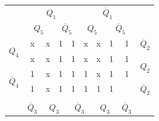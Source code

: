 \documentclass[a4paper,14pt]{article}
\begin{document}
\begin{table}[H]
\begin{minipage}{.5\linewidth}
\begin{tabular}{cccccccccc}
\end{tabular}
	\end{minipage}%
	\begin{minipage}{.5\linewidth}
		\centering
\begin{tabular}{cccccccccc}
	& \multicolumn{4}{c}{$Q_1$}                                                                         & \multicolumn{4}{c}{$\overline{Q}_1$}                                                              &                        \\
	& \multicolumn{2}{c}{$Q_5$}                       & \multicolumn{2}{c}{$\overline{Q}_5$}            & \multicolumn{2}{c}{$Q_5$}                       & \multicolumn{2}{c}{$\overline{Q}_5$}            &                        \\ \cline{2-9}
	\multicolumn{1}{c|}{\multirow{2}{*}{$Q_4$}}            & \multicolumn{1}{c|}{x} & \multicolumn{1}{c|}{x} & \multicolumn{1}{c|}{1} & \multicolumn{1}{c|}{1} & \multicolumn{1}{c|}{x} & \multicolumn{1}{c|}{x} & \multicolumn{1}{c|}{1} & \multicolumn{1}{c|}{1} & $\overline{Q}_2$       \\ \cline{2-9}
	\multicolumn{1}{c|}{}                                  & \multicolumn{1}{c|}{x} & \multicolumn{1}{c|}{x} & \multicolumn{1}{c|}{1} & \multicolumn{1}{c|}{1} & \multicolumn{1}{c|}{x} & \multicolumn{1}{c|}{x} & \multicolumn{1}{c|}{1} & \multicolumn{1}{c|}{1} & \multirow{2}{*}{$Q_2$} \\ \cline{2-9}
	\multicolumn{1}{c|}{\multirow{2}{*}{$\overline{Q}_4$}} & \multicolumn{1}{c|}{1} & \multicolumn{1}{c|}{x} & \multicolumn{1}{c|}{1} & \multicolumn{1}{c|}{1} & \multicolumn{1}{c|}{1} & \multicolumn{1}{c|}{x} & \multicolumn{1}{c|}{1} & \multicolumn{1}{c|}{1} &                        \\ \cline{2-9}
	\multicolumn{1}{c|}{}                                  & \multicolumn{1}{c|}{1} & \multicolumn{1}{c|}{x} & \multicolumn{1}{c|}{1} & \multicolumn{1}{c|}{1} & \multicolumn{1}{c|}{1} & \multicolumn{1}{c|}{1} & \multicolumn{1}{c|}{1} & \multicolumn{1}{c|}{}  & $\overline{Q}_2$       \\ \cline{2-9}
	&                        & \multicolumn{2}{c}{}                            & \multicolumn{2}{c}{}                            & \multicolumn{2}{c}{}                            &                        &                        \\
	& $\overline{Q}_3$       & \multicolumn{2}{c}{$Q_3$}                       & \multicolumn{2}{c}{$\overline{Q}_3$}            & \multicolumn{2}{c}{$Q_3$}                       & $\overline{Q}_3$       &                       
\end{tabular}
	\end{minipage} 
\end{table}
\end{document}
